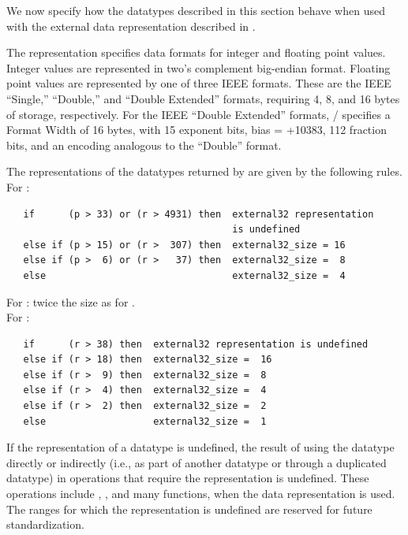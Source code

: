 We now specify how the datatypes described in this section
behave when used with the  external data representation
described in .

The  representation specifies data formats for integer
and floating point values. Integer values are represented in two's complement
big-endian format. Floating point values are represented by one
of three IEEE formats. These are the IEEE ``Single,'' ``Double,'' and
``Double Extended'' formats, requiring 4, 8, and 16 bytes of storage,
respectively.
For the IEEE ``Double Extended'' formats, \MPI/ specifies a
Format Width of 16 bytes, with 15 exponent bits, bias = +10383,
112 fraction bits, and an encoding analogous to the ``Double'' format.

The  representations of the datatypes returned by
%
%
%
are given by the following rules.
\\
\label{f90:kind:external32}
For :
\begin{verbatim}
   if      (p > 33) or (r > 4931) then  external32 representation
                                        is undefined
   else if (p > 15) or (r >  307) then  external32_size = 16
   else if (p >  6) or (r >   37) then  external32_size =  8
   else                                 external32_size =  4
\end{verbatim}
For : twice the size
as for\flushline %
.
\\
For :
\begin{verbatim}
   if      (r > 38) then  external32 representation is undefined
   else if (r > 18) then  external32_size =  16
   else if (r >  9) then  external32_size =  8
   else if (r >  4) then  external32_size =  4
   else if (r >  2) then  external32_size =  2
   else                   external32_size =  1
\end{verbatim}
If the  representation of
a datatype is undefined, the result of using the datatype directly
or indirectly (i.e., as part of another datatype or through a
duplicated datatype) in operations that require the 
representation is undefined. These operations include ,
, and many 
functions, when the  data representation is used.
The ranges for which the  representation is undefined are
reserved for future standardization.

